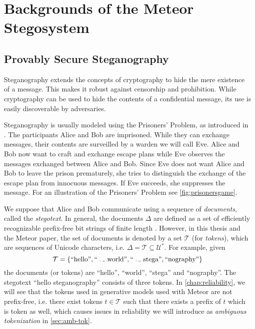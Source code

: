 \chapter{Backgrounds of the Meteor Stegosystem}
\label{chap:previous-work}

\section{Provably Secure Steganography}
\label{sec:prov-sec-steg}

Steganography extends the concepts of cryptography to hide the mere existence of a message.
This makes it robust against censorship and prohibition.
While cryptography can be used to hide the contents of a confidential message, its use is easily discoverable by adversaries.


Steganography is usually modeled using the Prisoners' Problem, as introduced in \cite{Simmons1983}.
The participants Alice and Bob are imprisoned.
While they can exchange messages, their contents are surveilled by a warden we will call Eve.
Alice and Bob now want to craft and exchange escape plans while Eve observes the messages exchanged between Alice and Bob.
Since Eve does not want Alice and Bob to leave the prison prematurely, she tries to distinguish the exchange of the escape plan from innocuous messages.
If Eve succeeds, she suppresses the message.
For an illustration of the Prisoners' Problem see \autoref{fig:prisonersgame}.

We suppose that Alice and Bob communicate using a sequence of \emph{documents}, called the \emph{stegotext}.
In general, the documents $\Delta$ are defined as a set of efficiently recognizable prefix-free bit strings of finite length \cite{Hopper2008}.
However, in this thesis and the Meteor paper, the set of documents is denoted by a set $\mathcal{T}$ (for \emph{tokens}), which are sequences of Unicode characters, i.e. $\Delta = \mathcal{T} \subseteq \mathcal{U}^*$. For example, given
$$\mathcal{T} = \{ \textrm{``hello''}, \textrm{``\Vtextvisiblespace world''}, \textrm{``\Vtextvisiblespace stega''}, \textrm{``nography''} \}$$ the documents (or tokens) are ``hello'', ``\Vtextvisiblespace world'', ``\Vtextvisiblespace stega'' and ``nography''.  
The stegotext ``hello steganography'' consists of three tokens.
In \autoref{chap:reliability}, we will see that the tokens used in generative models used with Meteor are not prefix-free, i.e. there exist tokens $t \in \mathcal{T}$ such that there exists a prefix of $t$ which is token as well, which causes issues in reliability we will introduce as \emph{ambiguous tokenization} in \autoref{sec:amb-tok}.

